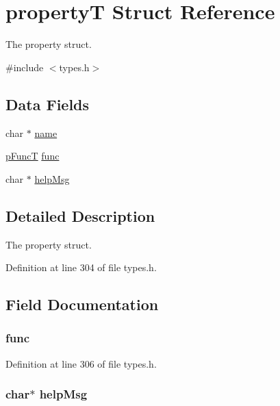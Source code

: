 \hypertarget{structproperty_t}{
\section{propertyT Struct Reference}
\label{structproperty_t}
}


The property struct.  




{\ttfamily \#include $<$types.h$>$}

\subsection*{Data Fields}
\begin{DoxyCompactItemize}
\item 
char $\ast$ \hyperlink{structproperty_t_a5ac083a645d964373f022d03df4849c8}{name}
\item 
\hyperlink{types_8h_a2551d4120f69e82950c9a349c650453d}{pFuncT} \hyperlink{structproperty_t_a6e26a6bc52b703ab5ccbce61991bf447}{func}
\item 
char $\ast$ \hyperlink{structproperty_t_aecae62b0d3cecad6022e749f64cc8a8e}{helpMsg}
\end{DoxyCompactItemize}


\subsection{Detailed Description}
The property struct. 

Definition at line 304 of file types.h.



\subsection{Field Documentation}
\hypertarget{structproperty_t_a6e26a6bc52b703ab5ccbce61991bf447}{
\subsubsection[{func}]{ {\bf func}}}
\label{structproperty_t_a6e26a6bc52b703ab5ccbce61991bf447}


Definition at line 306 of file types.h.

\hypertarget{structproperty_t_aecae62b0d3cecad6022e749f64cc8a8e}{
\subsubsection[{helpMsg}]{\setlength{\rightskip}{0pt plus 5cm}char$\ast$ {\bf helpMsg}}}
\label{structproperty_t_aecae62b0d3cecad6022e749f64cc8a8e}


